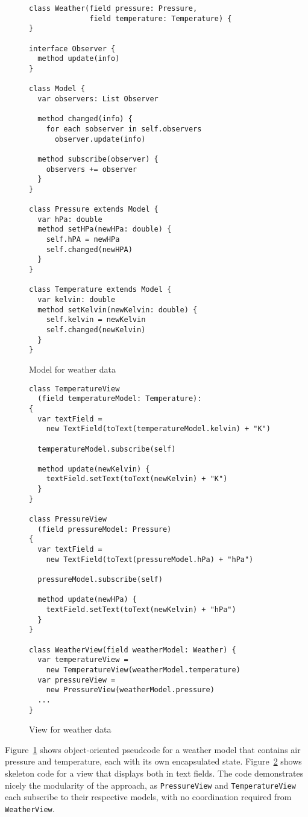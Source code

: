 \documentclass[sigplan,screen]{acmart}
\begin{document}
\begin{figure}[tb]
\begin{verbatim}
class Weather(field pressure: Pressure,
              field temperature: Temperature) {
}

interface Observer {
  method update(info)
}

class Model {
  var observers: List Observer

  method changed(info) {
    for each sobserver in self.observers
      observer.update(info)

  method subscribe(observer) {
    observers += observer
  }
}

class Pressure extends Model {
  var hPa: double
  method setHPa(newHPa: double) {
    self.hPA = newHPa
    self.changed(newHPA)
  }
}

class Temperature extends Model {
  var kelvin: double
  method setKelvin(newKelvin: double) {
    self.kelvin = newKelvin
    self.changed(newKelvin)
  }
}
\end{verbatim}
  \caption{Model for weather data}
  \label{fig:weather-model}
\end{figure}

\begin{figure}[tb]
\begin{verbatim}
class TemperatureView
  (field temperatureModel: Temperature):
{
  var textField =
    new TextField(toText(temperatureModel.kelvin) + "K")

  temperatureModel.subscribe(self)

  method update(newKelvin) {
    textField.setText(toText(newKelvin) + "K")
  }
}

class PressureView
  (field pressureModel: Pressure)
{
  var textField =
    new TextField(toText(pressureModel.hPa) + "hPa")

  pressureModel.subscribe(self)

  method update(newHPa) {
    textField.setText(toText(newKelvin) + "hPa")
  }
}

class WeatherView(field weatherModel: Weather) {
  var temperatureView =
    new TemperatureView(weatherModel.temperature)
  var pressureView =
    new PressureView(weatherModel.pressure)
  ...
}
\end{verbatim}
  \caption{View for weather data}
  \label{fig:weather-view}
\end{figure}

Figure~\ref{fig:weather-model} shows object-oriented pseudcode for a
weather model that contains air pressure and temperature, each with
its own encapsulated state.  Figure~\ref{fig:weather-view} shows
skeleton code for a view that displays both in text fields.  The code
demonstrates nicely the modularity of the approach, as
\texttt{PressureView} and \texttt{TemperatureView} each subscribe to
their respective models, with no coordination required from
\texttt{WeatherView}.
\end{document}

